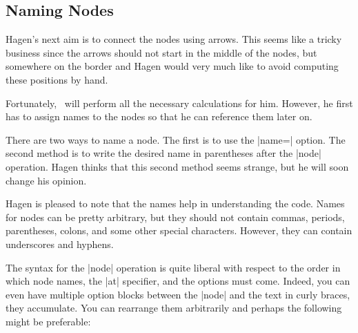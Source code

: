 \subsection{Naming Nodes}

Hagen's next aim is to connect the nodes using arrows. This seems like a tricky
business since the arrows should not start in the middle of the nodes, but
somewhere on the border and Hagen would very much like to avoid computing these
positions by hand.

Fortunately, \pgfname\ will perform all the necessary calculations for him.
However, he first has to assign names to the nodes so that he can reference
them later on.

There are two ways to name a node. The first is to use the |name=| option. The
second method is to write the desired name in parentheses after the |node|
operation. Hagen thinks that this second method seems strange, but he will soon
change his opinion.
%
\begin{codeexample}
\end{codeexample}
%
\begin{codeexample}[]
\end{codeexample}

Hagen is pleased to note that the names help in understanding the code. Names
for nodes can be pretty arbitrary, but they should not contain commas, periods,
parentheses, colons, and some other special characters. However, they can
contain underscores and hyphens.

The syntax for the |node| operation is quite liberal with respect to the order
in which node names, the |at| specifier, and the options must come. Indeed, you
can even have multiple option blocks between the |node| and the text in curly
braces, they accumulate. You can rearrange them arbitrarily and perhaps the
following might be preferable:
%
\begin{codeexample}[]
\end{codeexample}



